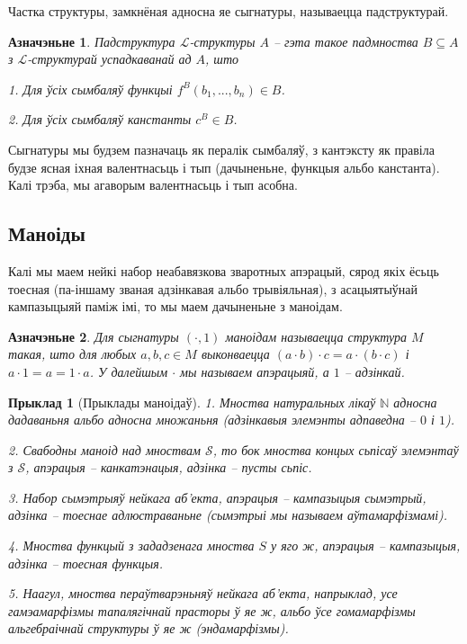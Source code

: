 \documentclass[a4paper,12pt]{book}
\newtheorem{example}{Прыклад}[section]
\newtheorem{definition}{Азначэньне}[section]
\begin{document}
Частка структуры, замкнёная адносна яе сыгнатуры, называецца
падструктурай.

\begin{definition}
  Падструктура $\mathcal{L}$-структуры $A$ -- гэта такое падмноства $B
  \subseteq A$ з $\mathcal{L}$-структурай успадкаванай ад $A$, што

  1. Для ўсіх сымбаляў функцыі $f^B(b_1, ..., b_n) \in B$.

  2. Для ўсіх сымбаляў канстанты $c^B \in B$.
\end{definition}

Сыгнатуры мы будзем пазначаць як пералік сымбаляў, з кантэксту як
правіла будзе ясная іхная валентнасьць і тып (дачыненьне, функцыя
альбо канстанта). Калі трэба, мы агаворым валентнасьць і тып асобна.

\subsection{Маноіды}

Калі мы маем нейкі набор неабавязкова зваротных апэрацый, сярод якіх
ёсьць тоесная (па-іншаму званая адзінкавая альбо трывіяльная), з
асацыятыўнай кампазыцыяй паміж імі, то мы маем
дачыненьне з маноідам.

\begin{definition}
  Для сыгнатуры $(\cdot, 1)$ маноідам называецца структура $M$ такая,
  што для любых $a, b, c \in M$ выконваецца $(a \cdot b) \cdot c = a
  \cdot (b \cdot c)$ і $a \cdot 1 = a = 1 \cdot a$. У далейшым $\cdot$
  мы называем апэрацыяй, а $1$ -- адзінкай.
\end{definition}

\begin{example}[Прыклады маноідаў]
  1. Мноства натуральных лікаў $\mathbb{N}$ адносна дадаваньня альбо адносна
  множаньня (адзінкавыя элемэнты адпаведна -- $0$ і $1$).

  2. Свабодны маноід над мноствам $\mathcal{S}$, то бок мноства
  концых сьпісаў элемэнтаў з $\mathcal{S}$, апэрацыя -- канкатэнацыя,
  адзінка -- пусты сьпіс.

  3. Набор сымэтрыяў нейкага аб'екта, апэрацыя -- кампазыцыя сымэтрый,
  адзінка -- тоеснае адлюстраваньне (сымэтрыі мы называем
  аўтамарфізмамі).

  4. Мноства функцый з зададзенага мноства $S$ у яго ж, апэрацыя --
  кампазыцыя, адзінка -- тоесная функцыя.

  5. Наагул, мноства пераўтварэньняў нейкага аб'екта, напрыклад, усе
  гамэамарфізмы тапалягічнай прасторы ў яе ж, альбо ўсе гомамарфізмы
  альгебраічнай структуры ў яе ж (эндамарфізмы).
\end{example}
\end{document}
